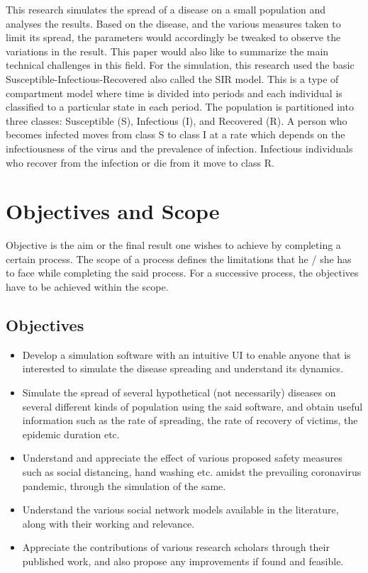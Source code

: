 \documentclass[conference]{IEEEtran}
\begin{document}
    This research simulates the spread of a disease on a small population and analyses the results. Based on the disease, and the various measures taken to limit its spread, the parameters would accordingly be tweaked to observe the variations in the result. This paper would also like to summarize the main technical challenges in this field. For the simulation, this research used the basic Susceptible-Infectious-Recovered also called the SIR model. This is a type of compartment model where time is divided into periods and each individual is classified to a particular state in each period. The population is partitioned into three classes: Susceptible (S), Infectious (I), and Recovered (R). A person who becomes infected moves from class S to class I at a rate which depends on the infectiousness of the virus and the prevalence of infection. Infectious individuals who recover from the infection or die from it move to class R.\\
    
    \section{Objectives and Scope}
    Objective is the aim or the final result one wishes to achieve by completing a certain process. The scope of a process defines the limitations that he / she has to face while completing the said process. For a successive process, the objectives have to be achieved within the scope.
        \subsection{Objectives}
            \begin{itemize}
                \item Develop a simulation software with an intuitive UI to enable anyone that is interested to simulate the disease spreading and understand its dynamics.
                \item Simulate the spread of several hypothetical (not necessarily) diseases on several different kinds of population using the said software, and obtain useful information such as the rate of spreading, the rate of recovery of victims, the epidemic duration etc.
                \item Understand and appreciate the effect of various proposed safety measures such as social distancing, hand washing etc. amidst the prevailing coronavirus pandemic, through the simulation of the same.
                \item Understand the various social network models available in the literature, along with their working and relevance.
                \item Appreciate the contributions of various research scholars through their published work, and also propose any improvements if found and feasible.
            \end{itemize}
\end{document}
